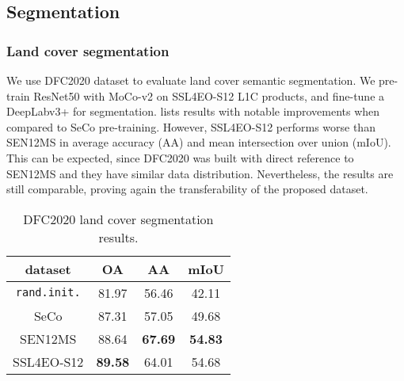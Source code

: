 \documentclass[lettersize,journal]{IEEEtran}
\begin{document}
\subsection{Segmentation}
\label{sec:segmentation}

\subsubsection{Land cover segmentation} We use DFC2020 \citep{rha7-m332-19} dataset to evaluate land cover semantic segmentation. We pre-train ResNet50 with MoCo-v2 on SSL4EO-S12 L1C products, and fine-tune a DeepLabv3+ \citep{chen2018encoder} for segmentation.  lists results with notable improvements when compared to SeCo pre-training. However, SSL4EO-S12 performs worse than SEN12MS in average accuracy (AA) and mean intersection over union (mIoU). This can be expected, since DFC2020 was built with direct reference to SEN12MS and they have similar data distribution. Nevertheless, the results are still comparable, proving again the transferability of the proposed dataset.
\vspace{-0.5em}
\begin{table}[h]
\centering
\caption{DFC2020 land cover segmentation results.}
\label{tab:dfc2020}
\begin{tabular}{cccc}
\hline
dataset         & OA & AA & mIoU \\ \hline \hline
\texttt{rand.init.}   & 81.97 & 56.46 & 42.11 \\
SeCo   & 87.31 & 57.05 & 49.68 \\
SEN12MS & 88.64 & \textbf{67.69} & \textbf{54.83}  \\
SSL4EO-S12 & \textbf{89.58} & 64.01 & 54.68  \\ 
\hline
\end{tabular}
\end{table}
\end{document}
